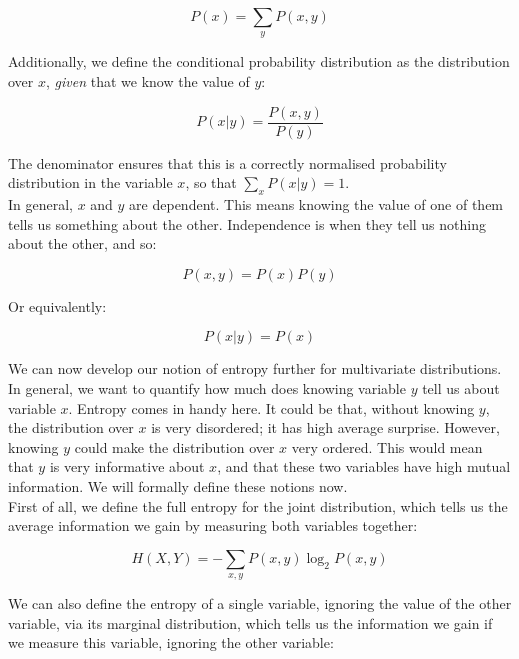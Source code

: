\documentclass{article}
\begin{document}
\begin{equation*}
	P(x) = \sum_y P(x,y)
\end{equation*}

Additionally, we define the conditional probability distribution as the distribution over $x$, \textit{given} that we know the value of $y$:

\begin{equation*}
	P(x|y) = \frac{P(x,y)}{P(y)}
\end{equation*}

The denominator ensures that this is a correctly normalised probability distribution in the variable $x$, so that $\sum_x P(x|y) = 1$.\\

In general, $x$ and $y$ are dependent. This means knowing the value of one of them tells us something about the other. Independence is when they tell us nothing about the other, and so:

\begin{equation*}
	P(x,y) = P(x)P(y)
\end{equation*}

Or equivalently:

\begin{equation*}
	P(x|y) = P(x)
\end{equation*}

We can now develop our notion of entropy further for multivariate distributions. In general, we want to quantify how much does knowing variable $y$ tell us about variable $x$. Entropy comes in handy here. It could be that, without knowing $y$, the distribution over $x$ is very disordered; it has high average surprise. However, knowing $y$ could make the distribution over $x$ very ordered. This would mean that $y$ is very informative about $x$, and that these two variables have high mutual information. We will formally define these notions now.\\

First of all, we define the full entropy for the joint distribution, which tells us the average information we gain by measuring both variables together:

\begin{equation*}
	H(X,Y) = -\sum_{x,y} P(x,y) \log_2P(x,y)
\end{equation*}

We can also define the entropy of a single variable, ignoring the value of the other variable, via its marginal distribution, which tells us the information we gain if we measure this variable, ignoring the other variable:
\end{document}

